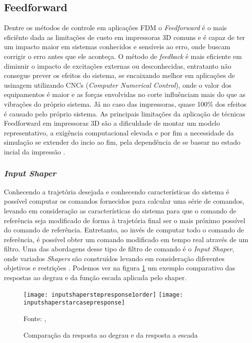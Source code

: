 \subsection{Feedforward}
Dentre os métodos de controle em aplicações FDM o \textit{Feedforward} 
é o mais eficiênte dada as limitações de custo em impressoras 
3D comuns e é capaz de ter um impacto maior em sistemas 
conhecidos e sensíveis ao erro, onde buscam corrigir o erro 
antes que ele aconteça. O método de \textit{feedback} é mais eficiente em
diminuir o impacto de excitações externas ou desconhecidas,
entratanto não consegue prever os efeitos do sistema, se encaixando
melhor em aplicações de usinagem utilizando CNCs (\textit{Computer Numerical Control}),
onde o valor dos equipamentos é maior e as forças envolvidas no corte
influênciam mais do que as vibrações do próprio sistema.
Já no caso das impressoras, quase 100\% dos efeitos é causado pelo próprio
sistema. As principais limitações da aplicação de técnicas Feedforward
em impressoras 3D são a dificuldade de montar um modelo representativo,
a exigência computacional elevada e por fim a necessidade da simulação
se extender do incio ao fim, pela dependência de se basear no estado 
incial da impressão \cite{ramani20,duan18}.

\subsubsection{\textit{Input Shaper}}
Conhecendo a trajetória desejada e conhecendo características 
do sistema é possível computar os comandos fornecidos para 
calcular uma série de comandos, levando em consideração as 
características do sistema para que o comando de referência 
seja modificado de forma à trajetória final ser o mais próximo 
possível do comando de referência. Entretanto, ao invés de 
computar todo o comando de referência, é possível obter um 
comando modificado em tempo real através de um filtro. 
Uma das abordagens desse tipo de filtro de comando é o 
\textit{Input Shaper}, onde variados \textit{Shapers} são construídos levando 
em consideração diferentes objetivos e restrições 
\cite{singhose97}.
Podemos
ver na figura \ref{fig:degr_vs_esc} um exemplo comparativo
das respostas ao degrau e da função escada aplicada pelo shaper.

\begin{figure}[!htb]
    \centering
    \caption{Comparação da resposta ao degrau e da resposta a escada}
    \texttt{[image: inputshaperstepresponse1order]}
    \texttt{[image: inputshaperstarcasepresponse]}

    {\footnotesize Fonte: \citeauthor{singhose97}, \citeyear{singhose97}}
    \label{fig:degr_vs_esc}
\end{figure}

